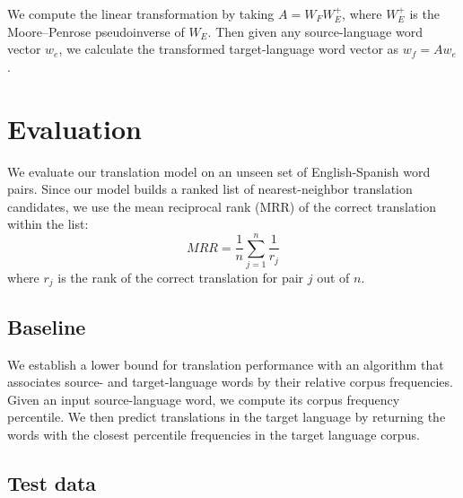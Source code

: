 \documentclass[11pt]{article}
\begin{document}
We compute the linear transformation by taking $A = W_F W_E^+$, where $W_E^+$ is the Moore--Penrose
pseudoinverse of $W_E$.
Then given any source-language word vector $w_e$, we calculate
the transformed target-language word vector as $w_f = A w_e$.

\section{Evaluation}
\label{sec:evaluation}
We evaluate our translation model on an unseen set of English-Spanish word pairs. Since our model builds a ranked list of nearest-neighbor translation candidates, we use the mean reciprocal rank (MRR) of the correct translation within the list:
\begin{equation}
    \textit{MRR} = \frac{1}{n}\sum_{j=1}^n \frac{1}{r_j}
\end{equation}
where $r_j$ is the rank of the correct translation for pair $j$ out of $n$.

\subsection{Baseline}
\label{subsec:baseline}

We establish a lower bound for translation performance with an algorithm that associates
source- and target-language words by their relative corpus frequencies. Given an input
source-language word, we compute its corpus frequency percentile. We then predict
translations in the target language by returning the words with the closest percentile
frequencies in the target language corpus.

\subsection{Test data}
\label{subsec:test-data}
\end{document}
